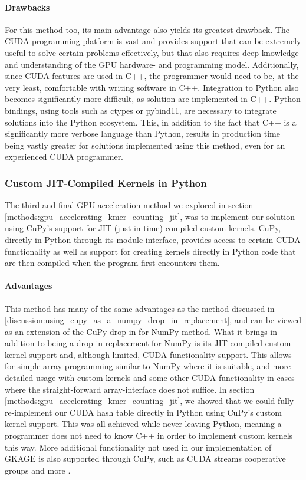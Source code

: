 \paragraph{Drawbacks}
For this method too, its main advantage also yields its greatest drawback.
The CUDA programming platform is vast and provides support that can be extremely useful to solve certain problems effectively, but that also requires deep knowledge and understanding of the GPU hardware- and programming model.
Additionally, since CUDA features are used in C++, the programmer would need to be, at the very least, comfortable with writing software in C++.
Integration to Python also becomes significantly more difficult, as solution are implemented in C++.
Python bindings, using tools such as ctypes or pybind11, are necessary to integrate solutions into the Python ecosystem.
This, in addition to the fact that C++ is a significantly more verbose language than Python, results in production time being vastly greater for solutions implemented using this method, even for an experienced CUDA programmer.

\subsubsection{Custom JIT-Compiled Kernels in Python}
The third and final GPU acceleration method we explored in section \ref{methods:gpu_accelerating_kmer_counting_jit}, was to implement our solution using CuPy's support for JIT (just-in-time) compiled custom kernels.
CuPy, directly in Python through its module interface, provides access to certain CUDA functionality as well as support for creating kernels directly in Python code that are then compiled when the program first encounters them.

\paragraph{Advantages}
This method has many of the same advantages as the method discussed in \ref{discussion:using_cupy_as_a_numpy_drop_in_replacement}, and can be viewed as an extension of the CuPy drop-in for NumPy method.
What it brings in addition to being a drop-in replacement for NumPy is its JIT compiled custom kernel support and, although limited, CUDA functionality support.
This allows for simple array-programming similar to NumPy where it is suitable, and more detailed usage with custom kernels and some other CUDA functionality in cases where the straight-forward array-interface does not suffice.
In section \ref{methods:gpu_accelerating_kmer_counting_jit}, we showed that we could fully re-implement our CUDA hash table directly in Python using CuPy's custom kernel support.
This was all achieved while never leaving Python, meaning a programmer does not need to know C++ in order to implement custom kernels this way.
More additional functionality not used in our implementation of GKAGE is also supported through CuPy, such as CUDA streams cooperative groups and more \cite{cupy}.


